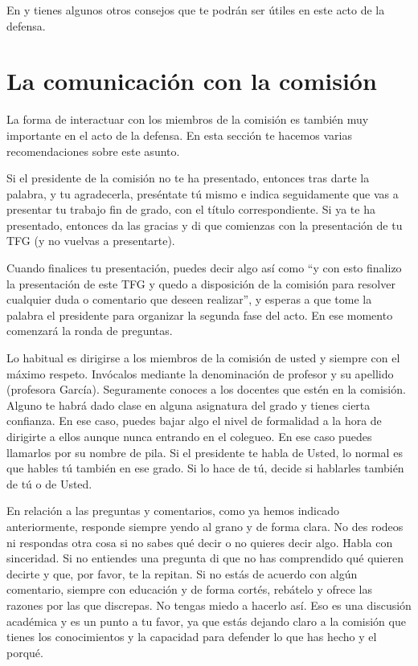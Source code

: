En \cite{vallejo2009defensa} y tienes algunos otros consejos que te podrán ser útiles en este acto de la defensa.


\section{La comunicación con la comisión}

La forma de interactuar con los miembros de la comisión es también muy importante en el acto de la defensa. En esta sección te hacemos varias recomendaciones sobre este asunto.

Si el presidente de la comisión no te ha presentado, entonces tras darte la palabra, y tu agradecerla, preséntate tú mismo e indica seguidamente que vas a presentar tu trabajo fin de grado, con el título correspondiente. Si ya te ha presentado, entonces da las gracias y di que comienzas con la presentación de tu TFG (y no vuelvas a presentarte). 

Cuando finalices tu presentación, puedes decir algo así como ``y con esto finalizo la presentación de este TFG y quedo a disposición de la comisión para resolver cualquier duda o comentario que deseen realizar'', y esperas a que tome la palabra el presidente para organizar la segunda fase del acto. En ese momento comenzará la ronda de preguntas. 

Lo habitual es dirigirse a los miembros de la comisión de usted y siempre con el máximo respeto. Invócalos mediante la denominación de profesor y su apellido (profesora García). Seguramente conoces a los docentes que estén en la comisión. Alguno te habrá dado clase en alguna asignatura del grado y tienes cierta confianza. En ese caso, puedes bajar algo el nivel de formalidad a la hora de dirigirte a ellos aunque nunca entrando en el colegueo. En ese caso puedes llamarlos por su nombre de pila. Si el presidente te habla de Usted, lo normal es que hables tú también en ese grado. Si lo hace de tú, decide si hablarles también de tú o de Usted. 

En relación a las preguntas y comentarios, como ya hemos indicado anteriormente, responde siempre yendo al grano y de forma clara. No des rodeos ni respondas otra cosa si no sabes qué decir o no quieres decir algo. Habla con sinceridad. Si no entiendes una pregunta di que no has comprendido qué quieren decirte y que, por favor, te la repitan. Si no estás de acuerdo con algún comentario, siempre con educación y de forma cortés, rebátelo y ofrece las razones por las que discrepas. No tengas miedo a hacerlo así. Eso es una discusión académica y es un punto a tu favor, ya que estás dejando claro a la comisión que tienes los conocimientos y la capacidad para defender lo que has hecho y el porqué.

